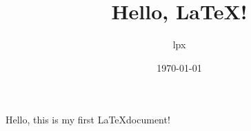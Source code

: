 \documentclass{ctexart}
\title{Hello, \LaTeX!}
\author{lpx}
\date{\today}
\begin{document}
Hello, this is my first \LaTeX document!
\end{document}
